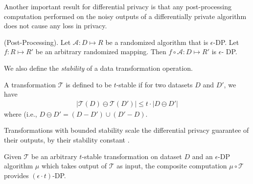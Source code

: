 Another important result for differential privacy is that any post-processing computation performed on the noisy outputs of a differentially private algorithm does not cause any loss in privacy.
\begin{theorem}(Post-Processing). Let $\mathcal{A}: D \mapsto R$ be a randomized
algorithm that is $\epsilon$-DP. Let $f : R \mapsto R'$ be an
arbitrary randomized mapping. Then $f \circ \mathcal{A} : D \mapsto R'$ is $\epsilon$-
DP. \label{post}\end{theorem}
We also define the \emph{stability} of a data transformation operation.
\begin{definition}A transformation $\mathcal{T}$ is defined to be $t$-stable if for two datasets $D$ and $D'$, we have\begin{gather}|\mathcal{T}(D)\ominus \mathcal{T}(D')| \leq t \cdot |D\ominus D'|  \end{gather} where  (i.e.,  $D \ominus D' = (D-D') \cup (D'-D)$. \end{definition}
Transformations with bounded stability scale the differential privacy guarantee of their outputs, by their stability constant \cite{PINQ}.
\begin{theorem}
Given $\mathcal{T}$ be an arbitrary $t$-stable transformation on dataset $D$ and an $\epsilon$-DP algorithm $\mu$ which takes output of $\mathcal{T}$ as input, the composite computation $\mu \circ \mathcal{T}$ provides $(\epsilon \cdot t)$-DP.\end{theorem}
